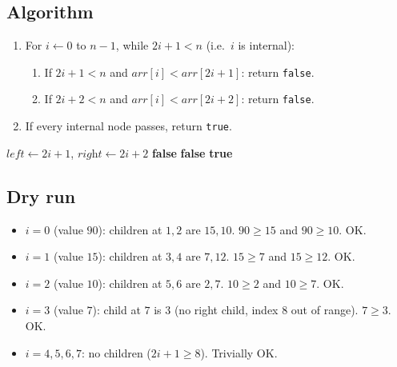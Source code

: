 \subsection*{Algorithm}

\begin{enumerate}
  \item For $i \gets 0$ to $n-1$, while $2i+1 < n$ (i.e.\ $i$ is internal):
  \begin{enumerate}
    \item If $2i+1 < n$ and $\textit{arr}[i] < \textit{arr}[2i+1]$: return
          \texttt{false}.
    \item If $2i+2 < n$ and $\textit{arr}[i] < \textit{arr}[2i+2]$: return
          \texttt{false}.
  \end{enumerate}
  \item If every internal node passes, return \texttt{true}.
\end{enumerate}

\begin{algorithm}[H]
\caption{Check Array Represents a Max-Heap}
\begin{algorithmic}[1]
    \State $\textit{left} \gets 2i+1$, $\textit{right} \gets 2i+2$
      \State \Return \textbf{false}
    \EndIf
      \State \Return \textbf{false}
    \EndIf
  \EndFor
  \State \Return \textbf{true}
\EndProcedure
\end{algorithmic}
\end{algorithm}

\subsection*{Dry run}


\begin{itemize}
  \item $i=0$ (value $90$): children at $1,2$ are $15,10$. $90 \ge 15$ and
        $90 \ge 10$. OK.
  \item $i=1$ (value $15$): children at $3,4$ are $7,12$. $15 \ge 7$ and
        $15 \ge 12$. OK.
  \item $i=2$ (value $10$): children at $5,6$ are $2,7$. $10 \ge 2$ and
        $10 \ge 7$. OK.
  \item $i=3$ (value $7$): child at $7$ is $3$ (no right child, index $8$
        out of range). $7 \ge 3$. OK.
  \item $i=4,5,6,7$: no children ($2i+1 \ge 8$). Trivially OK.
\end{itemize}

